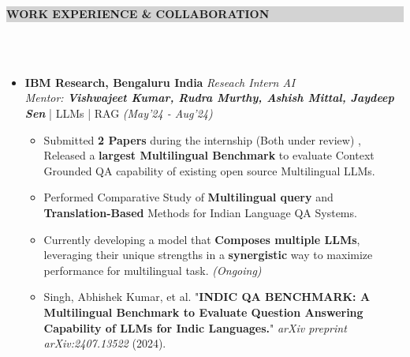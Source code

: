 \documentclass[a4paper,10.5pt]{article}
\newcommand{\lsep}{-0.5cm}
\newcommand{\resheading}[1]{{\small \colorbox{lightgray}{\begin{minipage}{0.975\textwidth}{\textbf{#1 \vphantom{p\^{E}}}}\end{minipage}}}}
\begin{document}
\resheading{\textbf{ WORK EXPERIENCE \& COLLABORATION}}\\[\lsep]  \\[-0.4cm]
\vspace{0.2cm}

\begin{itemize}[noitemsep,nolistsep]
\item \textbf{IBM Research, Bengaluru India} \hfill {\emph{Reseach Intern AI}}\\
\emph{Mentor: \textbf{Vishwajeet Kumar, Rudra Murthy, Ashish Mittal, Jaydeep Sen}} | LLMs | RAG \hfill
\emph{(May'24 - Aug'24)}
\vspace{0.1cm}
\begin{itemize}[noitemsep,nolistsep]
    \item Submitted \textbf{2 Papers} during the internship (Both under review) , Released a \textbf{largest Multilingual Benchmark} to evaluate Context Grounded QA capability of existing open source Multilingual LLMs.
    \vspace{0.07cm}
    \item Performed Comparative Study of \textbf{Multilingual query} and \textbf{Translation-Based} Methods for Indian Language QA Systems.
    \vspace{0.07cm}
    \item Currently developing a model that \textbf{Composes multiple LLMs}, leveraging their unique strengths in a \textbf{synergistic} way to maximize performance for multilingual task. \textit{(Ongoing)}
    \vspace{0.07cm}
    \item Singh, Abhishek Kumar, et al. "\textbf{INDIC QA BENCHMARK: A Multilingual Benchmark to Evaluate Question Answering Capability of LLMs for Indic Languages.}" \textit{arXiv preprint arXiv:2407.13522} (2024).
\end{itemize}
\end{itemize}
\vspace{0.2cm}


\end{document}
